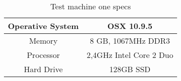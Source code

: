 \begin{table}[H]
  \caption{Test machine one specs}
  \label{tab:mac_test}
  \begin{center}
    \begin{tabular}{|c|c|}
      \hline
      Operative System & OSX 10.9.5 \\
      \hline
      Memory           & 8 GB, 1067MHz DDR3       \\
      \hline
      Processor        & 2,4GHz Intel Core 2  Duo \\
      \hline
      Hard Drive       & 128GB SSD  \\
      \hline
    \end{tabular}
  \end{center}
\end{table}
